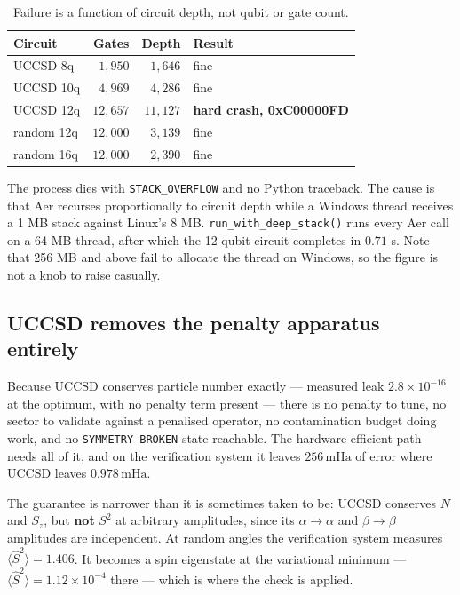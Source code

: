\documentclass[11pt,a4paper]{article}
\newcommand{\mHa}{\ensuremath{\,\mathrm{mHa}}}
\newcommand{\Ssq}{\ensuremath{\langle \hat{S}^2 \rangle}}
\newcommand{\code}[1]{\texttt{\small #1}}
\begin{document}
\begin{table}[htbp]
\centering
\caption{Failure is a function of circuit depth, not qubit or gate count.}
\label{tab:crash}
\small
\begin{tabular}{lrrl}
\toprule
Circuit & Gates & Depth & Result \\
\midrule
UCCSD 8q   & $1{,}950$  & $1{,}646$  & fine \\
UCCSD 10q  & $4{,}969$  & $4{,}286$  & fine \\
UCCSD 12q  & $12{,}657$ & $11{,}127$ & \textbf{hard crash, 0xC00000FD} \\
random 12q & $12{,}000$ & $3{,}139$  & fine \\
random 16q & $12{,}000$ & $2{,}390$  & fine \\
\bottomrule
\end{tabular}
\end{table}

The process dies with \code{STACK\_OVERFLOW} and no Python traceback. The cause
is that Aer recurses proportionally to circuit depth while a Windows thread
receives a 1 MB stack against Linux's 8 MB. \code{run\_with\_deep\_stack()} runs
every Aer call on a 64 MB thread, after which the 12-qubit circuit completes in
$0.71$ s. Note that 256 MB and above fail to allocate the thread on Windows, so
the figure is not a knob to raise casually.

\subsection{UCCSD removes the penalty apparatus entirely}

Because UCCSD conserves particle number exactly --- measured leak
$2.8\times10^{-16}$ at the optimum, with no penalty term present --- there is no
penalty to tune, no sector to validate against a penalised operator, no
contamination budget doing work, and no \code{SYMMETRY BROKEN} state reachable.
The hardware-efficient path needs all of it, and on the verification system it
leaves $256\mHa$ of error where UCCSD leaves $0.978\mHa$.

The guarantee is narrower than it is sometimes taken to be: UCCSD conserves $N$
and $S_z$, but \textbf{not} $S^2$ at arbitrary amplitudes, since its
$\alpha\!\to\!\alpha$ and $\beta\!\to\!\beta$ amplitudes are independent. At
random angles the verification system measures $\Ssq = 1.406$. It becomes a spin
eigenstate at the variational minimum --- $\Ssq = 1.12\times10^{-4}$ there ---
which is where the check is applied.
\end{document}
